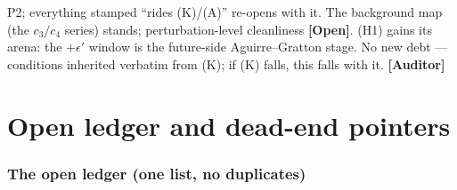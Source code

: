 \documentclass[11pt]{article}
\newcommand{\Auditor}{\textbf{\textcolor{teal!55!black}{[Auditor]}}}
\newcommand{\open}{\textcolor{red!70!black}{\textbf{[Open]}}}
\begin{document}
P2; everything stamped ``rides (K)/(A)'' re-opens with it. The background map (the $c_3/c_4$ series) stands; perturbation-level cleanliness \open. (H1) gains its arena: the $+\epsilon'$ window is the future-side Aguirre--Gratton stage. No new debt --- conditions inherited verbatim from (K); if (K) falls, this falls with it. \Auditor

\clearpage
\part{Open ledger and dead-end pointers}
\setcounter{section}{0}\setcounter{equation}{0}\setcounter{figure}{0}

\section{The open ledger (one list, no duplicates)}
\end{document}
